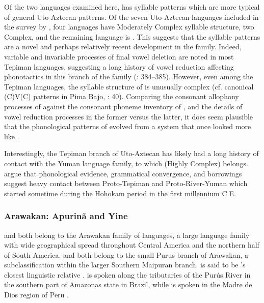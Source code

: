   Of the two languages examined here,  has syllable patterns which are more typical of general Uto-Aztecan patterns. Of the seven Uto-Aztecan languages included in the survey by \citet{Maddieson2013a}, four languages have Moderately Complex syllable structure, two Complex, and the remaining language is . This suggests that the  syllable patterns are a novel and perhaps relatively recent development in the family. Indeed, variable and invariable processes of final vowel deletion are noted in most Tepiman languages, suggesting a long history of vowel reduction affecting phonotactics in this branch of the family (\citealt{ShaulHill1998}: 384--385). However, even among the Tepiman languages, the syllable structure of  is unusually complex (cf. canonical (C)V(C) patterns in Pima Bajo,  \citealt{EstradaFernández2014}: 40). Comparing the consonant allophony processes of  against the consonant phoneme inventory of , and the details of vowel reduction processes in the former versus the latter, it does seem plausible that the phonological patterns of  evolved from a system that once looked more like .

  Interestingly, the Tepiman branch of Uto-Aztecan has likely had a long history of contact with the Yuman language family, to which  (Highly Complex) belongs. \citet{ShaulHill1998} argue that phonological evidence, grammatical convergence, and borrowings suggest heavy contact between Proto-Tepiman and Proto-River-Yuman which started sometime during the Hohokam period in the first millennium C.E.

\subsubsection{{Arawakan:} {Apurinã} {and} {Yine}}\label{sec:8.4.3.2}

   and  both belong to the Arawakan family of languages, a large language family with wide geographical spread throughout Central America and the northern half of South America.  and  both belong to the small Purus branch of Arawakan, a subclassification within the larger Southern Maipuran branch.  is said to be ’s closest linguistic relative \citep{Facundes2002}.  is spoken along the tributaries of the Purús River in the southern part of Amazonas state in Brazil, while  is spoken in the Madre de Dios region of Peru \citep{Aikhenvald1999}.

